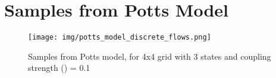 \documentclass{article}
\begin{document}


\clearpage

\appendix

\section{Samples from Potts Model}
\label{appendix:potts}

\begin{figure}[h!]
\centering
\texttt{[image: img/potts\_model\_discrete\_flows.png]}
\caption{Samples from Potts model, for 4x4 grid with 3 states and coupling strength () = 0.1}
\end{figure}
\end{document}
